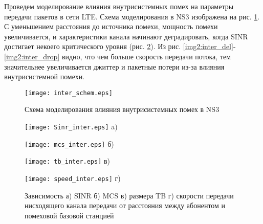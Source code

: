 Проведем моделирование влияния внутрисистемных помех на параметры передачи пакетов в сети LTE. Схема моделирования в NS3 изображена на рис. \ref{img:inter_schem}. С уменьшением расстояния до источника помехи, мощность помехи увеличивается, и характеристики канала начинают деградировать, когда SINR достигает некоего критического уровня (рис. \ref{img:inter}).
Из рис. \ref{img2:inter_del}-\ref{img2:inter_drop} видно, что чем больше скорость передачи потока, тем значительнее увеличивается джиттер и пакетные потери из-за влияния внутрисистемной помехи.
\begin{figure} [!h]
  \center
\texttt{[image: inter\_schem.eps]}
  \caption{Схема моделирования влияния внутрисистемных помех в NS3}
  \label{img:inter_schem}
\end{figure}
\begin{figure} [!h]
\begin{minipage}[h]{0.47\linewidth}
\center
\texttt{[image: Sinr\_inter.eps]} a) \\
\end{minipage}
\hfill
\begin{minipage}[h]{0.47\linewidth}
\center
\texttt{[image: mcs\_inter.eps]} б) \\
\end{minipage}
\vfill
\begin{minipage}[h]{0.47\linewidth}
\center
\texttt{[image: tb\_inter.eps]} в) \\
\end{minipage}
\hfill
\begin{minipage}[h]{0.47\linewidth}
\center
\texttt{[image: speed\_inter.eps]} г) \\
\end{minipage}
\caption{Зависимость а) SINR б) MCS в) размера TB г) скорости передачи нисходящего канала передачи от расстояния между абонентом и помеховой базовой станцией}
\label{img:inter}
\end{figure}


